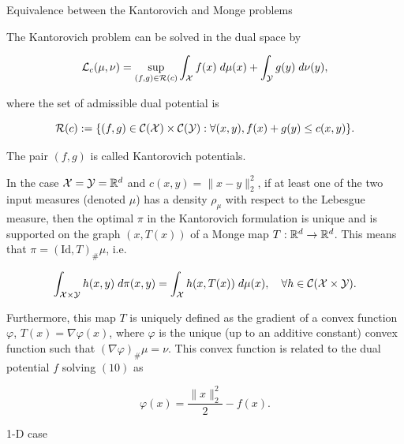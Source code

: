 \begin{frame}{Equivalence between the Kantorovich and Monge problems}
    \scriptsize
    \begin{Thm}
        The Kantorovich problem can be solved in the dual space by

        \vspace{-.7em}
        \begin{equation}
            \mathcal{L}_c(\mu,\nu)=\sup_{(f,g)\in \mathcal{R}(c)} 
            \int_{\mathcal{X}} f(x)\;d\mu(x) + \int_{\mathcal{Y}} g(y)\;d\nu(y),
            \label{equ:KantorovichDual}
        \end{equation}

        \vspace{-.4em}
        where the set of admissible dual potential is

        \vspace{-.4em}
        \begin{equation}
            \mathcal{R}(c) := \{(f,g) \in \mathcal{C}(\mathcal{X})\times\mathcal{C}(\mathcal{Y}) : 
            \forall (x,y), f(x)+g(y)\leq c(x,y)\}.
        \end{equation}

        \vspace{-.4em}
        The pair $(f,g)$ is called Kantorovich potentials.
    \end{Thm}

    \pause
    \begin{Thm}[Brenier]
        In the case $\mathcal{X}=\mathcal{Y}=\mathbb{R}^d$ and $c(x, y) =\|x-y\|_2^2$, 
        if at least one of the two input measures (denoted $\mu$) 
        has a density $\rho_\mu$ with respect to the Lebesgue measure, 
        then the optimal $\pi$ in the Kantorovich formulation is unique 
        and is supported on the graph $(x, T (x))$ of a Monge map
        $T : \mathbb{R}^d \to \mathbb{R}^d$. This means that $\pi = (\text{Id}, T)_\#\mu$, 
        i.e.

        \vspace{-.4em}
        \begin{equation}
            \int_{\mathcal{X}\times \mathcal{Y}} h(x,y)\;d\pi(x,y)=\int_{\mathcal{X}} h(x,T(x))\;d\mu(x),
            \quad \forall h\in\mathcal{C}(\mathcal{X}\times \mathcal{Y}).
        \end{equation}

        \vspace{-.4em}
        Furthermore, this map $T$ is uniquely defined as the gradient 
        of a convex function $\varphi$, $T (x) = \nabla \varphi(x)$, 
        where $\varphi$ is the unique (up to an additive constant) convex 
        function such that $(\nabla\varphi)_\#\mu = \nu$. This convex 
        function is related to the dual potential $f$ solving 
        $(10)$ as

        \vspace{-.4em}
        \begin{equation}
            \varphi(x)=\frac{\| x\|_2^2}{2} - f(x).
        \end{equation}
    \end{Thm}
\end{frame}

\begin{frame}{1-D case}
\end{frame}